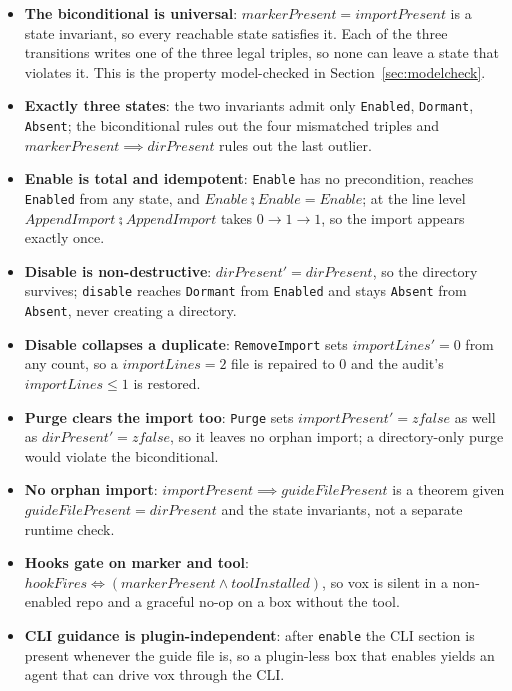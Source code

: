 \documentclass[a4paper,10pt,fleqn]{article}
\begin{document}
\begin{itemize}
  \item \textbf{The biconditional is universal}: $markerPresent = importPresent$
    is a state invariant, so every reachable state satisfies it. Each of the
    three transitions writes one of the three legal triples, so none can leave a
    state that violates it. This is the property model-checked in
    Section~\ref{sec:modelcheck}.
  \item \textbf{Exactly three states}: the two invariants admit only
    \texttt{Enabled}, \texttt{Dormant}, \texttt{Absent}; the biconditional rules
    out the four mismatched triples and $markerPresent \implies dirPresent$ rules
    out the last outlier.
  \item \textbf{Enable is total and idempotent}: \texttt{Enable} has no
    precondition, reaches \texttt{Enabled} from any state, and $Enable \semi
    Enable = Enable$; at the line level $AppendImport \semi AppendImport$ takes
    $0 \to 1 \to 1$, so the import appears exactly once.
  \item \textbf{Disable is non-destructive}: $dirPresent' = dirPresent$, so the
    directory survives; \texttt{disable} reaches \texttt{Dormant} from
    \texttt{Enabled} and stays \texttt{Absent} from \texttt{Absent}, never
    creating a directory.
  \item \textbf{Disable collapses a duplicate}: \texttt{RemoveImport} sets
    $importLines' = 0$ from any count, so a $importLines = 2$ file is repaired to
    $0$ and the audit's $importLines \leq 1$ is restored.
  \item \textbf{Purge clears the import too}: \texttt{Purge} sets
    $importPresent' = zfalse$ as well as $dirPresent' = zfalse$, so it leaves no
    orphan import; a directory-only purge would violate the biconditional.
  \item \textbf{No orphan import}: $importPresent \implies guideFilePresent$ is a
    theorem given $guideFilePresent = dirPresent$ and the state invariants, not a
    separate runtime check.
  \item \textbf{Hooks gate on marker and tool}: $hookFires \iff (markerPresent
    \land toolInstalled)$, so vox is silent in a non-enabled repo and a graceful
    no-op on a box without the tool.
  \item \textbf{CLI guidance is plugin-independent}: after \texttt{enable} the
    CLI section is present whenever the guide file is, so a plugin-less box that
    enables yields an agent that can drive vox through the CLI.
\end{itemize}
\end{document}
